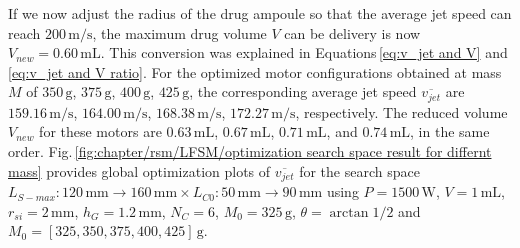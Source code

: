             
            If we now adjust the radius of the drug ampoule so that the average jet speed can reach $200\,\mathrm{m/s}$, the maximum drug volume $V$ can be delivery is now $V_{new}=0.60\,\mathrm{mL}$. This conversion was explained in Equations\,\ref{eq:v_jet and V} and \ref{eq:v_jet and V ratio}. For the optimized motor configurations obtained at mass $M$ of $350\,\mathrm{g}$, $375\,\mathrm{g}$, $400\,\mathrm{g}$, $425\,\mathrm{g}$, the corresponding average jet speed $\overline{v_{jet}}$ are $159.16\,\mathrm{m/s}$, $164.00\,\mathrm{m/s}$, $168.38\,\mathrm{m/s}$, $172.27\,\mathrm{m/s}$, respectively. The reduced volume $V_{new}$ for these motors are $0.63\,\mathrm{mL}$, $0.67\,\mathrm{mL}$, $0.71\,\mathrm{mL}$, and $0.74\,\mathrm{mL}$, in the same order. Fig.\,\ref{fig:chapter/rsm/LFSM/optimization search space result for differnt mass} provides global optimization plots of $\overline{v_{jet}}$ for the search space $L_{S-max}:120\,\mathrm{mm}\rightarrow 160\,\mathrm{mm} \times L_{C0}:50\,\mathrm{mm}\rightarrow 90\,\mathrm{mm}$ using $P=1500\,\mathrm{W}$, $V=1\,\mathrm{mL}$, $r_{si}=2\,\mathrm{mm}$, $h_G=1.2\,\mathrm{mm}$, $N_C=6$, $M_0=325\,\mathrm{g}$, $\theta = \arctan{1/2}$ and $M_0=[325,350,375,400,425]\,\mathrm{g}$. 
 
